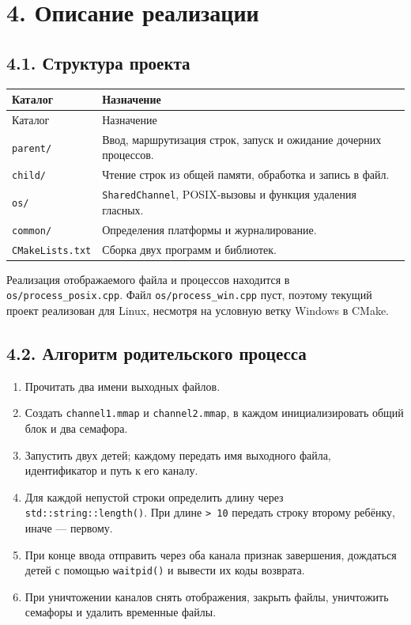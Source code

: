 \documentclass[12pt,a4paper]{article}
\begin{document}
\section*{4. Описание реализации}
\subsection*{4.1. Структура проекта}
\begin{longtable}{|p{2.7cm}|p{11.8cm}|}
\hline
Каталог & Назначение \\
\hline
\endfirsthead
\hline
Каталог & Назначение \\
\hline
\endhead
\texttt{parent/} & Ввод, маршрутизация строк, запуск и ожидание дочерних процессов. \\
\hline
\texttt{child/} & Чтение строк из общей памяти, обработка и запись в файл. \\
\hline
\texttt{os/} & \texttt{SharedChannel}, POSIX-вызовы и функция удаления гласных. \\
\hline
\texttt{common/} & Определения платформы и журналирование. \\
\hline
\texttt{CMakeLists.txt} & Сборка двух программ и библиотек. \\
\hline
\end{longtable}
Реализация отображаемого файла и процессов находится в \texttt{os/process\_posix.cpp}. Файл \texttt{os/process\_win.cpp} пуст, поэтому текущий проект реализован для Linux, несмотря на условную ветку Windows в CMake.

\subsection*{4.2. Алгоритм родительского процесса}
\begin{enumerate}
\item Прочитать два имени выходных файлов.
\item Создать \texttt{channel1.mmap} и \texttt{channel2.mmap}, в каждом инициализировать общий блок и два семафора.
\item Запустить двух детей; каждому передать имя выходного файла, идентификатор и путь к его каналу.
\item Для каждой непустой строки определить длину через \texttt{std::string::length()}. При длине \texttt{> 10} передать строку второму ребёнку, иначе --- первому.
\item При конце ввода отправить через оба канала признак завершения, дождаться детей с помощью \texttt{waitpid()} и вывести их коды возврата.
\item При уничтожении каналов снять отображения, закрыть файлы, уничтожить семафоры и удалить временные файлы.
\end{enumerate}
\end{document}
